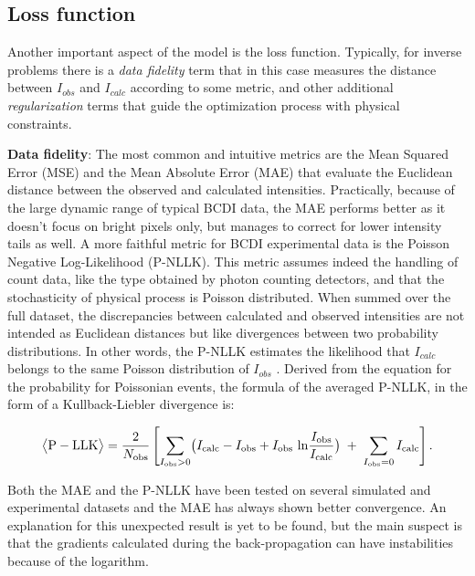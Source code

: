 \subsection{Loss function}
Another important aspect of the model is the loss function. Typically, for inverse problems there is a \textit{data fidelity}
term that in this case measures the distance between $I_{obs}$ and $ I_{calc}$ according to some metric, and other additional 
\textit{regularization} terms that guide the optimization process with physical constraints. 

\textbf{Data fidelity}: 
The most common and intuitive metrics are the Mean Squared Error (MSE) and the Mean Absolute Error (MAE) that evaluate 
the Euclidean distance between the observed and calculated intensities. Practically, because of the large dynamic range 
of typical BCDI data, the MAE performs better as it doesn't focus on bright pixels only, but manages to correct for lower 
intensity tails as well. 
A more faithful metric for BCDI experimental data is the Poisson Negative Log-Likelihood (P-NLLK). This metric assumes 
indeed the handling of count data, like the type obtained by photon counting detectors, and that the stochasticity of physical 
process is Poisson distributed. When summed over the full dataset, the discrepancies between calculated and observed 
intensities are not intended as Euclidean distances but like divergences between two probability distributions. In other 
words, the P-NLLK estimates the likelihood that $I_{calc}$ belongs to the same Poisson distribution of $I_{obs}$ \cite{Thibault_2012}. 
Derived from the equation for the probability for Poissonian events, the formula of the averaged P-NLLK, in the form of 
a Kullback-Liebler divergence is: 

\begin{equation}
    \bigl\langle \mathrm{P-LLK}\bigr\rangle
    = \frac{2}{N_{\mathrm{obs}}}
    \left[
      \sum_{I_{\rm obs}>0}
        \bigl(
          I_{\rm calc} - I_{\rm obs}
          + I_{\rm obs}\,\ln\!\frac{I_{\rm obs}}{I_{\rm calc}}
        \bigr)
      \;+\;
      \sum_{I_{\rm obs}=0} I_{\rm calc}
    \right].
\end{equation}
    

Both the MAE and the P-NLLK have been tested on several simulated and experimental datasets and the MAE has always shown 
better convergence. An explanation for this unexpected result is yet to be found, but the main suspect is that the gradients 
calculated during the back-propagation can have instabilities because of the logarithm. 

